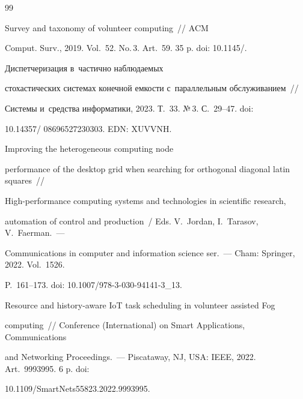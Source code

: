 {\small\frenchspacing


{%




\begin{thebibliography}{99}




 Survey and taxonomy of volunteer computing~/\!\!/ ACM 


Comput. Surv., 2019. Vol.~52. No.\,3. Art.~59. 35 p. doi: 10.1145\!/.







 Диспетчеризация в~частично на\-блю\-да\-емых 


стохастических системах конечной емкости с~параллельным обслуживанием~/\!\!/ 


Сис\-те\-мы и~средства информатики, 2023. Т.~33. №\,3. С.~29--47. doi: 


10.14357\!/ 08696527230303. EDN: XUVVNH.







 Improving the heterogeneous computing node 


performance of the desktop grid when searching for orthogonal diagonal latin squares~/\!\!/ 


High-performance computing systems and technologies in scientific research, 


automation of control and production~/ Eds. V.~Jordan, I.~Tarasov,  V.~Faerman.~--- 


Communications in computer and information science ser.~--- Cham: Springer, 2022. Vol.~1526. 


P.~161--173. doi: 10.1007/978-3-030-94141-3\_13.




 Resource and history-aware IoT task scheduling in volunteer assisted Fog 


computing~/\!\!/  Conference (International) on Smart Applications, Communications 


and Networking Proceedings.~--- Piscataway, NJ, USA: IEEE, 2022. Art.~9993995. 6 p. doi: 


10.1109\!/\!SmartNets55823.2022.9993995.



\end{thebibliography}}}
